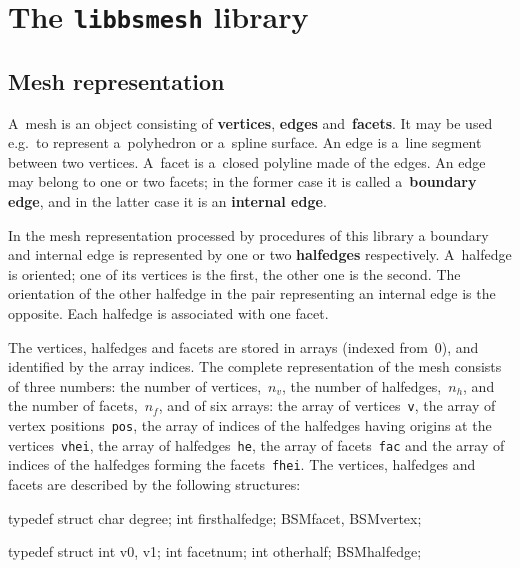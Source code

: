 

\chapter{The \texttt{libbsmesh} library}

\section{\label{sect:bsmesh:representation}Mesh representation}

A~mesh is an object consisting of \textbf{vertices}, \textbf{edges}
and~\textbf{facets}. It may be used e.g.\ to represent a~polyhedron or
a~spline surface. An edge is a~line segment between two vertices. A~facet is
a~closed polyline made of the edges. An edge may belong to one or two
facets; in the former case it is called a~\textbf{boundary edge}, and in the
latter case it is an \textbf{internal edge}.

In the mesh representation processed by procedures of this library a
boundary and internal edge is represented by one or two \textbf{halfedges}
respectively. A~halfedge is oriented; one of its vertices is the first, the
other one is the second. The orientation of the other halfedge in the pair
representing an internal edge is the opposite. Each halfedge is associated
with one facet.

The vertices, halfedges and facets are stored in arrays (indexed from~$0$),
and identified by the array indices. The complete representation of the mesh
consists of three numbers: the number of vertices,~$n_v$, the number of
halfedges,~$n_h$, and the number of facets,~$n_f$, and of six arrays:
the array of vertices~\texttt{v}, the array of vertex
positions~\texttt{pos}, the array of indices of the halfedges
having origins at the vertices~\texttt{vhei}, the array of
halfedges~\texttt{he}, the array of facets~\texttt{fac} and the array of
indices of the halfedges forming the facets~\texttt{fhei}. The vertices,
halfedges and facets are described by the following structures:

\vspace{\medskipamount}
\begin{listingC}
typedef struct {
    char degree;
    int  firsthalfedge;
  } BSMfacet, BSMvertex;

typedef struct {
    int v0, v1; 
    int facetnum;
    int otherhalf;
  } BSMhalfedge;  
\end{listingC}


